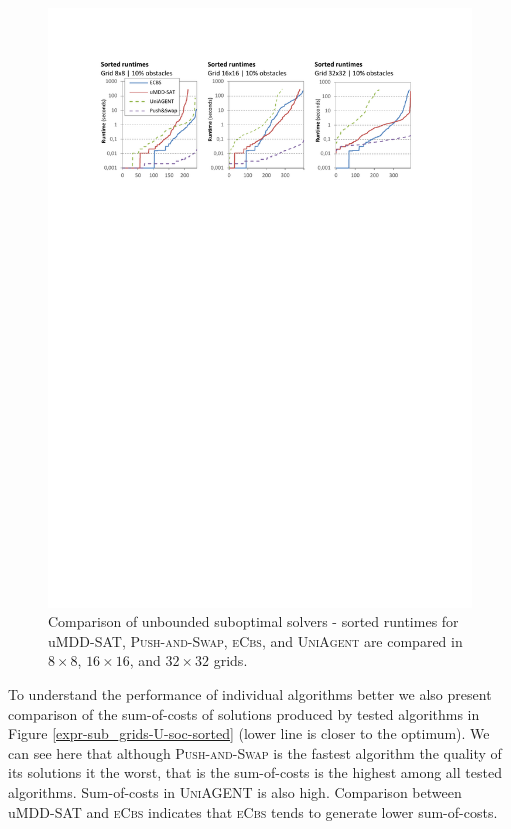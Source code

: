 \documentclass[jair,oneside,11pt]{article}
\begin{document}
\begin{figure}[h]
\centering
\includegraphics[trim={2.5cm 21.0cm 2.5cm 2.5cm},clip,width=\textwidth]{expr-sub_grids-U-sorted.pdf}
\vspace{-0.8cm}
\caption{Comparison of unbounded suboptimal solvers  - sorted runtimes for uMDD-SAT, \textsc{Push-and-Swap},  \textsc{eCbs}, and \textsc{UniAgent} are compared in $8{}\times{}8$, $16{}\times{}16$, and $32{}\times{}32$ grids.}
\label{expr-sub_grids-U-time-sorted}
\end{figure}


To understand the performance of individual algorithms better we also present comparison of the sum-of-costs of solutions produced by tested algorithms in Figure \ref{expr-sub_grids-U-soc-sorted} (lower line is closer to the optimum). We can see here that although \textsc{Push-and-Swap} is the fastest algorithm the quality of its solutions it the worst, that is the sum-of-costs is the highest among all tested algorithms. Sum-of-costs in \textsc{UniAGENT} is also high. Comparison between uMDD-SAT and \textsc{eCbs} indicates that \textsc{eCbs} tends to generate lower sum-of-costs.
\end{document}
